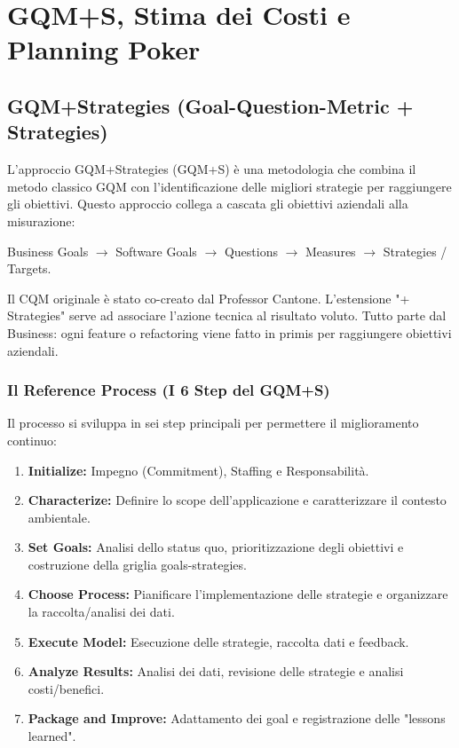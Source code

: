 \chapter{GQM+S, Stima dei Costi e Planning Poker}

\section{GQM+Strategies (Goal-Question-Metric + Strategies)}
L'approccio GQM+Strategies (GQM+S) è una metodologia che combina il metodo classico GQM con l'identificazione delle migliori strategie per raggiungere gli obiettivi. Questo approccio collega a cascata gli obiettivi aziendali alla misurazione:
\begin{center}
    Business Goals $\rightarrow$ Software Goals $\rightarrow$ Questions $\rightarrow$ Measures $\rightarrow$ Strategies / Targets.
\end{center}

\begin{notaprof}
Il CQM originale è stato co-creato dal Professor Cantone. L'estensione "+ Strategies" serve ad associare l'azione tecnica al risultato voluto. Tutto parte dal Business: ogni feature o refactoring viene fatto in primis per raggiungere obiettivi aziendali.
\end{notaprof}

\subsection{Il Reference Process (I 6 Step del GQM+S)}
Il processo si sviluppa in sei step principali per permettere il miglioramento continuo:
\begin{enumerate}[start=0]
    \item \textbf{Initialize:} Impegno (Commitment), Staffing e Responsabilità.
    \item \textbf{Characterize:} Definire lo scope dell'applicazione e caratterizzare il contesto ambientale.
    \item \textbf{Set Goals:} Analisi dello status quo, prioritizzazione degli obiettivi e costruzione della griglia goals-strategies.
    \item \textbf{Choose Process:} Pianificare l'implementazione delle strategie e organizzare la raccolta/analisi dei dati.
    \item \textbf{Execute Model:} Esecuzione delle strategie, raccolta dati e feedback.
    \item \textbf{Analyze Results:} Analisi dei dati, revisione delle strategie e analisi costi/benefici.
    \item \textbf{Package and Improve:} Adattamento dei goal e registrazione delle "lessons learned".
\end{enumerate}

